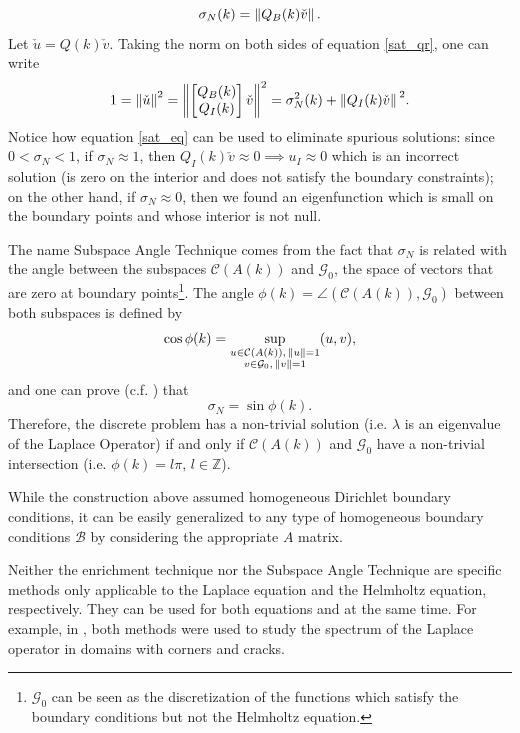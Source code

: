 \[
    \sigma_N(k) = \norm*{Q_B(k) \check{v}}.
\]
Let \(\check{u} = Q(k) \check{v}\). Taking the norm on both sides of equation \eqref{sat_qr}, one can write
\begin{equation}\label{sat_eq}
    1 = \norm{\check{u}}^2 = \norm{\begin{bmatrix}
        Q_B(k)\\
        Q_I(k)
    \end{bmatrix}\check{v}}^2 = \sigma_N^2(k) + \norm*{Q_I(k) \check{v}}^2.
\end{equation}
Notice how equation \eqref{sat_eq} can be used to eliminate spurious solutions: since \(0 < \sigma_N < 1\), if \(\sigma_N \approx 1\), then \(Q_I(k) \check{v} \approx 0 \implies u_I \approx 0\) which is an incorrect solution (is zero on the interior and does not satisfy the boundary constraints); on the other hand, if \(\sigma_N \approx 0\), then we found an eigenfunction which is small on the boundary points and whose interior is not null.

The name Subspace Angle Technique comes from the fact that \(\sigma_N\) is related with the angle between the subspaces \(\mathcal{C}(A(k))\) and \(\mathcal{G}_0\), the space of vectors that are zero at boundary points\footnote{\(\mathcal{G}_0\) can be seen as the discretization of the functions which satisfy the boundary conditions but not the Helmholtz equation.}. The angle \(\phi(k)=\angle (\mathcal{C}(A(k)), \mathcal{G}_0)\) between both subspaces is defined by
\[
    \cos \phi(k) = \sup_{\substack{u \in \mathcal{C}(A(k)), \, \norm{u}=1 \\ v \in \mathcal{G}_0, \, \norm*{v} = 1}} (u, v),
\]
and one can prove (c.f. \cite{betcke2005reviving}) that
\[
    \sigma_N = \sin \phi(k).
\]
Therefore, the discrete problem has a non-trivial solution (i.e. \(\lambda\) is an eigenvalue of the Laplace Operator) if and only if \(\mathcal{C}(A(k))\) and \(\mathcal{G}_0\) have a non-trivial intersection (i.e. \(\phi(k) = l \pi, \, l \in \mathbb{Z}\)).

\begin{remark}
    While the construction above assumed homogeneous Dirichlet boundary conditions, it can be easily generalized to any type of homogeneous boundary conditions \(\mathcal{B}\) by considering the appropriate \(A\) matrix.
\end{remark}

\begin{remark}
    Neither the enrichment technique nor the Subspace Angle Technique are specific methods only applicable to the Laplace equation and the Helmholtz equation, respectively. They can be used for both equations and at the same time. For example, in \cite{antunes2010meshfree}, both methods were used to study the spectrum of the Laplace operator in domains with corners and cracks.
\end{remark}

